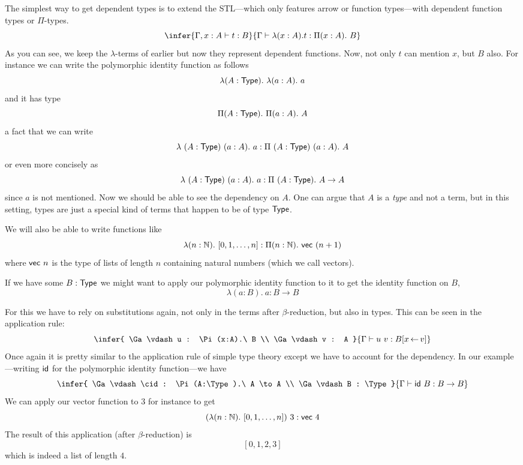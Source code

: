 The simplest way to get dependent types is to extend the \acrshort{STL}---which
only features arrow or function types---with dependent function types or
\(\Pi\)-types.
\[
  \infer
    {\Ga, x :A \vdash t : B}
    {\Ga \vdash \lambda (x:A).t : \Pi (x:A).\ B}
\]
As you can see, we keep the \(\lambda\)-terms of earlier but now they represent
dependent functions. Now, not only \(t\) can mention \(x\), but \(B\) also.
For instance we can write the polymorphic identity function as follows
\[
  \lambda (A : \mathsf{Type}).\ \lambda (a : A).\ a
\]
and it has type
\[
  \Pi (A : \mathsf{Type}).\ \Pi (a : A).\ A
\]
a fact that we can write
\[
  \lambda\ (A : \mathsf{Type})\ (a : A).\ a
  : \Pi\ (A : \mathsf{Type})\ (a : A).\ A
\]
or even more concisely as
\[
  \lambda\ (A : \mathsf{Type})\ (a : A).\ a
  : \Pi\ (A : \mathsf{Type}).\ A \to A
\]
since \(a\) is not mentioned.
Now we should be able to see the dependency on \(A\).
One can argue that \(A\) is a \emph{type} and not a term, but in this setting,
types are just a special kind of terms that happen to be of type \(\mathsf{Type}\).

We will also be able to write functions like
\[
  \lambda (n : \mathbb{N}).\ [ 0, 1, \dots, n ] :
  \Pi (n : \mathbb{N}).\ \mathsf{vec}\ (n+1)
\]
where \(\mathsf{vec}\ n\) is the type of lists of length \(n\) containing natural
numbers (which we call vectors).

If we have some \(B : \mathsf{Type}\) we might want to apply our polymorphic identity
function to it to get the identity function on \(B\), \ie
\[
  \lambda (a:B).\ a : B \to B
\]

For this we have to rely on substitutions again, not only in the terms after
\(\beta\)-reduction, but also in types.
This can be seen in the application rule:
\[
  \infer
    {
      \Ga \vdash u : \Pi (x:A).\ B \\
      \Ga \vdash v : A
    }
    {\Ga \vdash u\ v : B[x \sto v]}
\]
Once again it is pretty similar to the application rule of simple type theory
except we have to account for the dependency. In our example---writing \(\mathsf{id}\)
for the polymorphic identity function---we have
\[
  \infer
    {
      \Ga \vdash \cid : \Pi (A:\Type).\ A \to A \\
      \Ga \vdash B : \Type
    }
    {\Ga \vdash \cid\ B : B \to B}
\]
We can apply our vector function to \(3\) for instance to get
\[
  (\lambda (n : \mathbb{N}).\ [ 0, 1, \dots, n ])\ 3 : \mathsf{vec}\ 4
\]
The result of this application (\ie after \(\beta\)-reduction) is
\[
  [0, 1, 2, 3]
\]
which is indeed a list of length \(4\).

